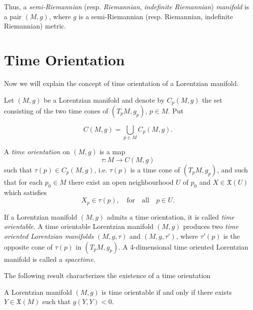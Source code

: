 Thus, a \emph{semi-Riemannian} (resp. \emph{Riemannian}, \emph{indefinite Riemannian}) \emph{manifold} is a pair $(M,g)$, where $g$ is a semi-Riemannian (resp. Riemannian, indefinite Riemannian) metric.


\section{Time Orientation}

Now we will explain the concept of time orientation of a Lorentzian manifold.

Let $(M,g)$ be a Lorentzian manifold and denote by $C_p(M,g)$ the set consisting of the two time cones of $(T_pM,g_p)$, $p\in M$. Put

\[
C(M,g)=\bigcup_{p\in M} C_p(M,g).
\]

A \emph{time orientation} on $(M,g)$ is a map
\[
\tau : M \longrightarrow C(M,g)
\]
such that $\tau(p)\in C_p(M,g)$, i.e. $\tau(p)$ is a time cone of $(T_pM,g_p)$, and such that for each $p_0\in M$ there exist an open neighbourhood $U$ of $p_0$ and $X\in \mathfrak{X}(U)$ which satisfies
\[
X_p \in \tau(p), \quad \mathrm{for \quad all} \quad p\in U.
\]

If a Lorentzian manifold $(M,g)$ admits a time orientation, it is called \emph{time orientable}. A time orientable Lorentzian manifold $(M,g)$ produces two \emph{time oriented Lorentzian manifolds} $(M,g,\tau)$ and $(M,g,\tau ')$, where $\tau '(p)$ is the opposite cone of $\tau(p)$ in $(T_pM,g_p)$. A 4-dimensional time oriented Lorentzian manifold is called a \emph{spacetime}.

The following result characterizes the existence of a time orientation \cite[Lemma 5.32]{oneill83}

\begin{proposition}
	\label{time_orientable}
	A Lorentzian manifold $(M,g)$ is time orientable if and only if there exists $Y\in \mathfrak{X}(M)$ such that $g(Y,Y)<0$.
\end{proposition}

